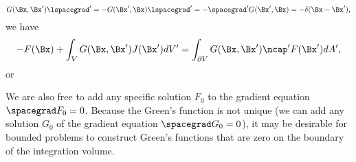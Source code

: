\begin{dmath}\label{eqn:greensFunctionGradient:520}
G(\Bx, \Bx') \lspacegrad'
=
-G(\Bx', \Bx) \lspacegrad'
=
-
\spacegrad' G(\Bx', \Bx)
= -\delta(\Bx - \Bx'),
\end{dmath}
we have
\begin{dmath}\label{eqn:greensFunctionGradient:540}
-F(\Bx)
+
\int_V G(\Bx, \Bx') J(\Bx') dV'
=
\int_{\partial V} G(\Bx, \Bx') \ncap' F(\Bx') dA',
\end{dmath}
or

We are also free to add any specific solution \( F_0 \) to the gradient equation \( \spacegrad F_0 = 0 \).
Because the Green's function is not unique (we can add any solution \( G_0 \) of the gradient equation \( \spacegrad G_0 = 0 \)),
it may be desirable for bounded problems to construct Green's functions that are zero on the boundary of the integration volume.

